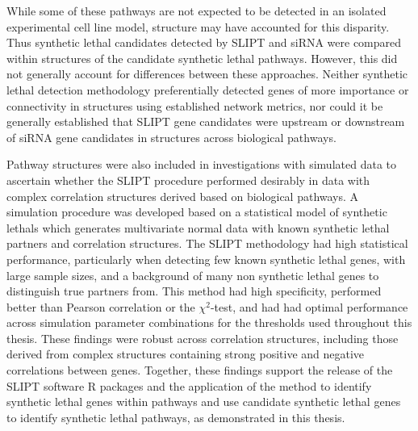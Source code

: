 While some of these pathways are not expected to be detected in an isolated experimental cell line model,  structure may have accounted for this disparity. Thus \gls{synthetic lethal} candidates detected by \gls{SLIPT} and \gls{siRNA} were compared within  structures of the candidate \gls{synthetic lethal} pathways. However, this did not generally account for differences between these approaches. Neither \gls{synthetic lethal} detection methodology preferentially detected genes of more importance or connectivity in  structures using established network metrics, nor could it be generally established that \gls{SLIPT} gene candidates were upstream or downstream of \gls{siRNA} gene candidates in  structures across biological pathways.

Pathway  structures were also included in investigations with simulated data to ascertain whether the \gls{SLIPT} procedure performed desirably in data with complex correlation structures derived based on biological pathways. A simulation procedure was developed based on a statistical model of \glspl{synthetic lethal} which generates multivariate normal data with known \gls{synthetic lethal} partners and correlation structures. The \gls{SLIPT} methodology had high statistical performance, particularly when detecting few known \gls{synthetic lethal} genes, with large sample sizes, and a background of many non \gls{synthetic lethal} genes to distinguish true partners from. This method had high specificity, performed better than Pearson correlation or the $\chi^2$-test, and had had optimal performance across simulation parameter combinations for the thresholds used throughout this thesis. These findings were robust across correlation structures, including those derived from complex  structures containing strong positive and negative correlations between genes. 
Together, these findings support the release of the \gls{SLIPT} software R packages and the application of the method to identify \gls{synthetic lethal} genes within pathways and use candidate \gls{synthetic lethal} genes to identify \gls{synthetic lethal} pathways, as demonstrated in this thesis.



